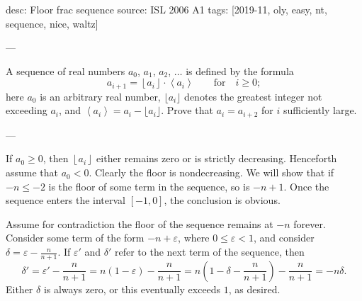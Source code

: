 desc: Floor frac sequence
source: ISL 2006 A1
tags: [2019-11, oly, easy, nt, sequence, nice, waltz]

---

A sequence of real numbers $a_0$, $a_1$, $a_2$, $\ldots$ is defined by the formula \[a_{i+1}=\left\lfloor a_i\right\rfloor\cdot\left\langle a_i\right\rangle\qquad\text{for}\quad i\ge0;\]
here $a_0$ is an arbitrary real number, $\lfloor a_i\rfloor$ denotes the greatest integer not exceeding $a_i$, and $\left\langle a_i\right\rangle=a_i-\lfloor a_i\rfloor$. Prove that $a_i=a_{i+2}$ for $i$ sufficiently large.

---

If $a_0\ge0$, then $\left\lfloor a_i\right\rfloor$ either remains zero or is strictly decreasing. Henceforth assume that $a_0<0$. Clearly the floor is nondecreasing. We will show that if $-n\le-2$ is the floor of some term in the sequence, so is $-n+1$. Once the sequence enters the interval $[-1,0]$, the conclusion is obvious.

Assume for contradiction the floor of the sequence remains at $-n$ forever. Consider some term of the form $-n+\varepsilon$, where $0\le\varepsilon<1$, and consider $\delta=\varepsilon-\frac n{n+1}$. If $\varepsilon'$ and $\delta'$ refer to the next term of the sequence, then \[\delta'=\varepsilon'-\frac n{n+1}=n(1-\varepsilon)-\frac n{n+1}=n\left(1-\delta-\frac n{n+1}\right)-\frac n{n+1}=-n\delta.\]
Either $\delta$ is always zero, or this eventually exceeds $1$, as desired.
